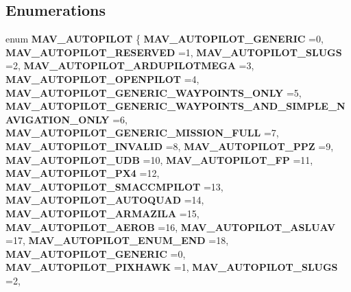 \subsection*{Enumerations}
\begin{DoxyCompactItemize}
\item 
enum \textbf{ M\+A\+V\+\_\+\+A\+U\+T\+O\+P\+I\+L\+OT} \{ \newline
\textbf{ M\+A\+V\+\_\+\+A\+U\+T\+O\+P\+I\+L\+O\+T\+\_\+\+G\+E\+N\+E\+R\+IC} =0, 
\textbf{ M\+A\+V\+\_\+\+A\+U\+T\+O\+P\+I\+L\+O\+T\+\_\+\+R\+E\+S\+E\+R\+V\+ED} =1, 
\textbf{ M\+A\+V\+\_\+\+A\+U\+T\+O\+P\+I\+L\+O\+T\+\_\+\+S\+L\+U\+GS} =2, 
\textbf{ M\+A\+V\+\_\+\+A\+U\+T\+O\+P\+I\+L\+O\+T\+\_\+\+A\+R\+D\+U\+P\+I\+L\+O\+T\+M\+E\+GA} =3, 
\newline
\textbf{ M\+A\+V\+\_\+\+A\+U\+T\+O\+P\+I\+L\+O\+T\+\_\+\+O\+P\+E\+N\+P\+I\+L\+OT} =4, 
\textbf{ M\+A\+V\+\_\+\+A\+U\+T\+O\+P\+I\+L\+O\+T\+\_\+\+G\+E\+N\+E\+R\+I\+C\+\_\+\+W\+A\+Y\+P\+O\+I\+N\+T\+S\+\_\+\+O\+N\+LY} =5, 
\textbf{ M\+A\+V\+\_\+\+A\+U\+T\+O\+P\+I\+L\+O\+T\+\_\+\+G\+E\+N\+E\+R\+I\+C\+\_\+\+W\+A\+Y\+P\+O\+I\+N\+T\+S\+\_\+\+A\+N\+D\+\_\+\+S\+I\+M\+P\+L\+E\+\_\+\+N\+A\+V\+I\+G\+A\+T\+I\+O\+N\+\_\+\+O\+N\+LY} =6, 
\textbf{ M\+A\+V\+\_\+\+A\+U\+T\+O\+P\+I\+L\+O\+T\+\_\+\+G\+E\+N\+E\+R\+I\+C\+\_\+\+M\+I\+S\+S\+I\+O\+N\+\_\+\+F\+U\+LL} =7, 
\newline
\textbf{ M\+A\+V\+\_\+\+A\+U\+T\+O\+P\+I\+L\+O\+T\+\_\+\+I\+N\+V\+A\+L\+ID} =8, 
\textbf{ M\+A\+V\+\_\+\+A\+U\+T\+O\+P\+I\+L\+O\+T\+\_\+\+P\+PZ} =9, 
\textbf{ M\+A\+V\+\_\+\+A\+U\+T\+O\+P\+I\+L\+O\+T\+\_\+\+U\+DB} =10, 
\textbf{ M\+A\+V\+\_\+\+A\+U\+T\+O\+P\+I\+L\+O\+T\+\_\+\+FP} =11, 
\newline
\textbf{ M\+A\+V\+\_\+\+A\+U\+T\+O\+P\+I\+L\+O\+T\+\_\+\+P\+X4} =12, 
\textbf{ M\+A\+V\+\_\+\+A\+U\+T\+O\+P\+I\+L\+O\+T\+\_\+\+S\+M\+A\+C\+C\+M\+P\+I\+L\+OT} =13, 
\textbf{ M\+A\+V\+\_\+\+A\+U\+T\+O\+P\+I\+L\+O\+T\+\_\+\+A\+U\+T\+O\+Q\+U\+AD} =14, 
\textbf{ M\+A\+V\+\_\+\+A\+U\+T\+O\+P\+I\+L\+O\+T\+\_\+\+A\+R\+M\+A\+Z\+I\+LA} =15, 
\newline
\textbf{ M\+A\+V\+\_\+\+A\+U\+T\+O\+P\+I\+L\+O\+T\+\_\+\+A\+E\+R\+OB} =16, 
\textbf{ M\+A\+V\+\_\+\+A\+U\+T\+O\+P\+I\+L\+O\+T\+\_\+\+A\+S\+L\+U\+AV} =17, 
\textbf{ M\+A\+V\+\_\+\+A\+U\+T\+O\+P\+I\+L\+O\+T\+\_\+\+E\+N\+U\+M\+\_\+\+E\+ND} =18, 
\textbf{ M\+A\+V\+\_\+\+A\+U\+T\+O\+P\+I\+L\+O\+T\+\_\+\+G\+E\+N\+E\+R\+IC} =0, 
\newline
\textbf{ M\+A\+V\+\_\+\+A\+U\+T\+O\+P\+I\+L\+O\+T\+\_\+\+P\+I\+X\+H\+A\+WK} =1, 
\textbf{ M\+A\+V\+\_\+\+A\+U\+T\+O\+P\+I\+L\+O\+T\+\_\+\+S\+L\+U\+GS} =2, 

\end{DoxyCompactItemize}
